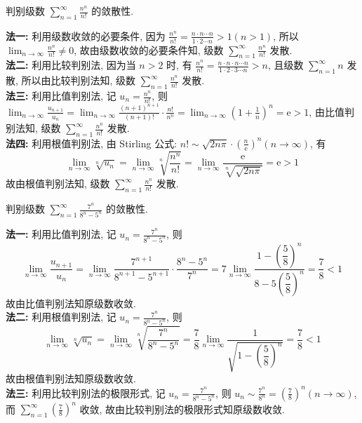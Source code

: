 \begin{example}
    判别级数 $\displaystyle  \sum_{n=1}^{\infty} \frac{n^{n}}{n!} $ 的敛散性.
\end{example}
\begin{solution}
    \textbf{法一: }利用级数收敛的必要条件, 因为 $\displaystyle  \frac{n^{n}}{n!}=\frac{n \cdot n \cdots n}{1 \cdot 2 \cdots n}>1(n>1) $, 所以 $\displaystyle  \lim _{n \to \infty} \frac{n^{n}}{n!} \neq 0 $, 故由级数收敛的必要条件知, 级数 $\displaystyle  \sum_{n=1}^{\infty} \frac{n^{n}}{n!} $ 发散.\\
    \textbf{法二: }利用比较判别法, 因为当 $ n>2 $ 时, 有 $\displaystyle  \frac{n^{n}}{n!}=\frac{n \cdot n \cdot n \cdots n}{1 \cdot 2 \cdot 3 \cdots n}>n $, 且级数 $\displaystyle  \sum_{n=1}^{\infty} n $ 发散, 所以由比较判别法知, 级数 $\displaystyle  \sum_{n=1}^{\infty} \frac{n^{n}}{n!} $ 发散.\\
    \textbf{法三: }利用比值判别法, 记 $\displaystyle  u_{n}=\frac{n^{n}}{n!} $, 则 $\displaystyle  \lim _{n \to \infty} \frac{u_{n+1}}{u_{n}}=\lim _{n \to \infty} \frac{(n+1)^{n+1}}{(n+1)!} \cdot \frac{n!}{n^{n}}=\lim _{n \to \infty}\left(1+\frac{1}{n}\right)^{n}=\mathrm{e}>1 $, 由比值判别法知, 级数 $\displaystyle  \sum_{n=1}^{\infty} \frac{n^{n}}{n!} $ 发散.\\
    \textbf{法四: }利用根值判别法, 由 Stirling 公式: $\displaystyle  n!\sim \sqrt{2 n \pi} \cdot\left(\frac{n}{\mathrm{e}}\right)^{n}(n \to \infty) $, 有
    $$
        \lim _{n \to \infty} \sqrt[n]{u_{n}}=\lim _{n \to \infty} \sqrt[n]{\frac{n^{n}}{n!}}=\lim _{n \to \infty} \frac{\mathrm{e}}{\sqrt[n]{\sqrt{2 n \pi}}}=\mathrm{e}>1
    $$
    故由根值判别法知, 级数 $\displaystyle  \sum_{n=1}^{\infty} \frac{n^{n}}{n!} $ 发散.
\end{solution}

\begin{example}
    判别级数 $\displaystyle \sum_{n=1}^{\infty} \frac{7^{n}}{8^{n}-5^{n}} $ 的敛散性.
\end{example}
\begin{solution}
    \textbf{法一: }利用比值判别法, 记 $\displaystyle u_{n}=\frac{7^{n}}{8^{n}-5^{n}} $, 则 $$\displaystyle \lim _{n \to \infty} \frac{u_{n+1}}{u_{n}}=\lim _{n \to \infty} \dfrac{7^{n+1}}{8^{n+1}-5^{n+1}} \cdot \dfrac{8^{n}-5^{n}}{7^{n}}=7 \lim _{n \to \infty} \frac{1-\left(\dfrac{5}{8}\right)^{n}}{8-5\left(\dfrac{5}{8}\right)^{n}}=\frac{7}{8}<1 $$
    故由比值判别法知原级数收敛.\\
    \textbf{法二: }利用根值判别法, 记 $\displaystyle u_{n}=\frac{7^{n}}{8^{n}-5^{n}} $, 则
    $$\lim _{n \to \infty} \sqrt[n]{u_{n}}=\lim _{n \to \infty} \sqrt[n]{\frac{7^{n}}{8^{n}-5^{n}}}=\frac{7}{8} \lim _{n \to \infty} \frac{1}{\sqrt{1-\left(\dfrac{5}{8}\right)^{n}}}=\frac{7}{8}<1$$
    故由根值判别法知原级数收敛.\\
    \textbf{法三: }利用比较判别法的极限形式, 记 $\displaystyle u_{n}=\frac{7^{n}}{8^{n}-5^{n}} $, 则 $\displaystyle u_{n} \sim \frac{7^{n}}{8^{n}}=\left(\frac{7}{8}\right)^{n}(n \to \infty) $, 而 $\displaystyle \sum_{n=1}^{\infty}\left(\frac{7}{8}\right)^{n} $ 收敛, 故由比较判别法的极限形式知原级数收敛.
\end{solution}

